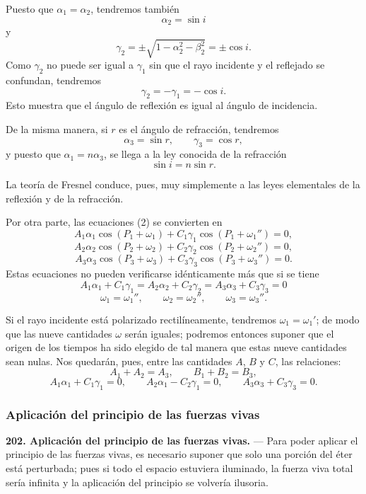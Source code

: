 Puesto que $\alpha_1=\alpha_2$, tendremos también
\[
\alpha_2=\sin i
\]
y
\[
\gamma_2=\pm\sqrt{1-\alpha_2^2-\beta_2^2}=\pm\cos i.
\]
Como $\gamma_2$ no puede ser igual a $\gamma_1$ sin que el rayo incidente
y el reflejado se confundan, tendremos
\[
\gamma_2=-\gamma_1=-\cos i.
\]
Esto muestra que el ángulo de reflexión es igual al ángulo de incidencia.

De la misma manera, si $r$ es el ángulo de refracción, tendremos
\[
\alpha_3=\sin r,\qquad \gamma_3=\cos r,
\]
y puesto que $\alpha_1=n\alpha_3$, se llega a la ley conocida de la
refracción
\[
\sin i=n\sin r.
\]

La teoría de Fresnel conduce, pues, muy simplemente a las leyes
elementales de la reflexión y de la refracción.

Por otra parte, las ecuaciones (2) se convierten en
\[
A_1\alpha_1\cos(P_1+\omega_1)+C_1\gamma_1\cos(P_1+\omega_1'')=0,
\]
\[
A_2\alpha_2\cos(P_2+\omega_2)+C_2\gamma_2\cos(P_2+\omega_2'')=0,
\]
\[
A_3\alpha_3\cos(P_3+\omega_3)+C_3\gamma_3\cos(P_3+\omega_3'')=0.
\]
Estas ecuaciones no pueden verificarse idénticamente más que si se tiene
\[
A_1\alpha_1+C_1\gamma_1=A_2\alpha_2+C_2\gamma_2=A_3\alpha_3+C_3\gamma_3=0
\]
\[
\omega_1=\omega_1'',\qquad \omega_2=\omega_2'',\qquad \omega_3=\omega_3''.
\]

Si el rayo incidente está polarizado rectilíneamente, tendremos
$\omega_1=\omega_1'$; de modo que las nueve cantidades $\omega$ serán
iguales; podremos entonces suponer que el origen de los tiempos ha sido
elegido de tal manera que estas nueve cantidades sean nulas. Nos quedarán,
pues, entre las cantidades $A$, $B$ y $C$, las relaciones:
\begin{equation}
A_1+A_2=A_3,\qquad B_1+B_2=B_3,
\end{equation}
\begin{equation}
A_1\alpha_1+C_1\gamma_1=0,\qquad A_2\alpha_1-C_2\gamma_1=0,\qquad
A_3\alpha_3+C_3\gamma_3=0.
\end{equation}

\subsubsection{Aplicación del principio de las fuerzas vivas}

\noindent\textbf{202. Aplicación del principio de las fuerzas vivas.} —
Para poder aplicar el principio de las fuerzas vivas, es necesario suponer
que solo una porción del éter está perturbada; pues si todo el espacio
estuviera iluminado, la fuerza viva total sería infinita y la aplicación
del principio se volvería ilusoria.

